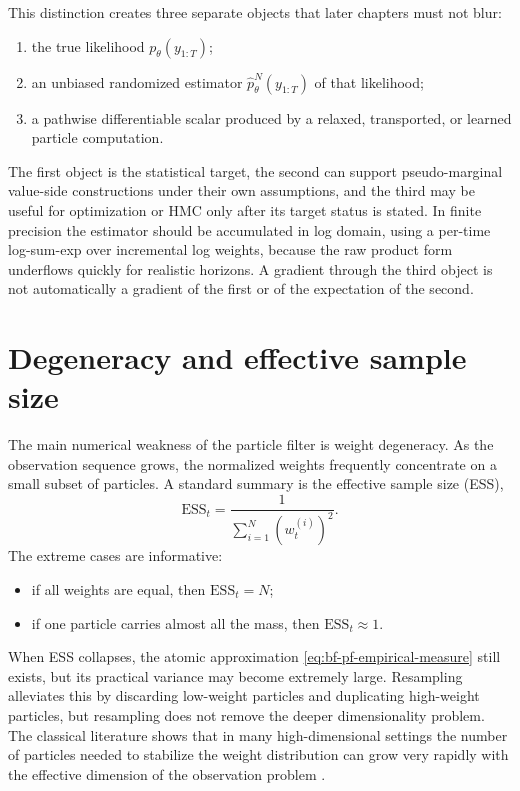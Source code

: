 This distinction creates three separate objects that later chapters must not
blur:
\begin{enumerate}[label=(\roman*)]
  \item the true likelihood $p_\theta(y_{1:T})$;
  \item an unbiased randomized estimator
    $\hat p_\theta^N(y_{1:T})$ of that likelihood;
  \item a pathwise differentiable scalar produced by a relaxed, transported, or
    learned particle computation.
\end{enumerate}
The first object is the statistical target, the second can support
pseudo-marginal value-side constructions under their own assumptions, and the
third may be useful for optimization or HMC only after its target status is
stated.  In finite precision the estimator should be accumulated in log domain,
using a per-time log-sum-exp over incremental log weights, because the raw
product form underflows quickly for realistic horizons.  A gradient through the third object is not automatically a gradient of
the first or of the expectation of the second.

\section{Degeneracy and effective sample size}
\label{sec:bf-pf-degeneracy}

The main numerical weakness of the particle filter is weight degeneracy.  As the
observation sequence grows, the normalized weights frequently concentrate on a
small subset of particles.  A standard summary is the effective sample size
(ESS),
\begin{equation}
\label{eq:bf-pf-ess}
  \mathrm{ESS}_t = \frac{1}{\sum_{i=1}^N (w_t^{(i)})^2}.
\end{equation}
The extreme cases are informative:
\begin{itemize}
  \item if all weights are equal, then $\mathrm{ESS}_t=N$;
  \item if one particle carries almost all the mass, then
    $\mathrm{ESS}_t \approx 1$.
\end{itemize}
When ESS collapses, the atomic approximation
\eqref{eq:bf-pf-empirical-measure} still exists, but its practical variance may
become extremely large.  Resampling alleviates this by discarding low-weight
particles and duplicating high-weight particles, but resampling does not remove
the deeper dimensionality problem.  The classical literature shows that in many
high-dimensional settings the number of particles needed to stabilize the weight
distribution can grow very rapidly with the effective dimension of the
observation problem \citep{bengtsson2008curse,snyder2008obstacles}.

